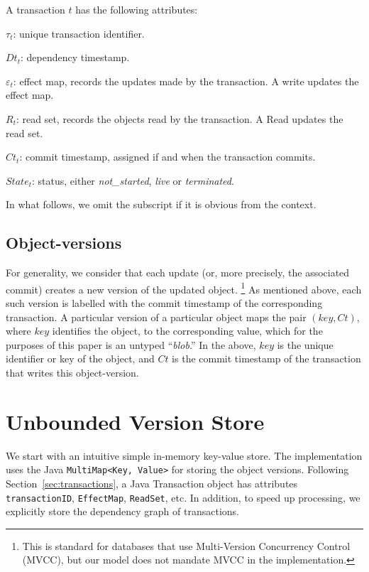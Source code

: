 \documentclass[systeme,french,english]{compas2022}
\begin{document}
A transaction $t$ has the following attributes:
\begin{compactitem}
\item $\tau_{t}$: unique transaction identifier.
\item $\mathit{Dt}_{t}$: dependency timestamp.
\item {$\varepsilon_{t}$}: effect map, records the updates made by the
  transaction.
  A write updates the effect map.
\item ${R}_{t}$: read set, records the objects read by the transaction.
  A Read updates the read set.
\item $\mathit{Ct}_{t}$: commit timestamp, assigned if and when the
  transaction commits.
\item $\mathit{State}_{t}$: status, either \emph{not\_started}, \emph{live} or \emph{terminated}.
\end{compactitem}
In what follows, we omit the subscript if it is obvious from the context.

\subsection{Object-versions}

For generality, we consider that each update (or, more precisely, the
associated commit) creates a new version of the updated object.%
%
\footnote{
%
  This is standard for databases that use Multi-Version Concurrency
  Control (MVCC), but our model does not mandate MVCC in the
  implementation.
}
%
As mentioned above, each such version is labelled with the commit
timestamp of the corresponding transaction.
A particular version of a particular object maps the pair
$(\mathit{key},\mathit{Ct})$, where $\mathit{key}$ identifies the
object, to the corresponding value, which for the purposes of this paper
is an untyped ``\emph{blob}.''
In the above, $\mathit{key}$ is the unique identifier or key of the
object, and $\mathit{Ct}$ is the commit timestamp of the transaction
that writes this object-version.

\section{Unbounded Version Store}

We start with an intuitive simple in-memory key-value store.
The implementation uses the Java \texttt{MultiMap<Key, Value>} for
storing the object versions.
Following Section~\ref{sec:transactions}, a Java Transaction object has
attributes \texttt{transactionID}, \texttt{EffectMap}, \texttt{ReadSet},
etc.
In addition, to speed up processing, we explicitly store the
dependency graph of transactions.
\end{document}
